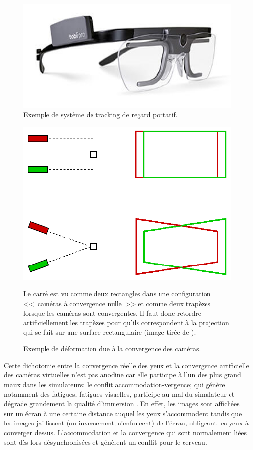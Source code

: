 	\begin{figure}[h]
		\centering
		\includegraphics[scale=1]{Figures/EyeTrackerTobii}
		\caption{Exemple de système de tracking de regard portatif.}
		\label{fig:eye_tracker}
	\end{figure}
	
	\begin{figure}[h]
		\centering
		\includegraphics[scale=.75]{Figures/RedressementPlansVision}
		\caption{Exemple de déformation due à la convergence des caméras.}{Le carré est vu comme deux rectangles dans une configuration <<~caméras à convergence nulle~>> et comme deux trapèzes lorsque les caméras sont convergentes. Il faut donc retordre artificiellement les trapèzes pour qu'ils correspondent à la projection qui se fait sur une surface rectangulaire (image tirée de \citep{aurat_immersion_2016}).}
		\label{fig:redressement_plan_vision}
	\end{figure}
	
	\par Cette dichotomie entre la convergence réelle des yeux et la convergence artificielle des caméras virtuelles n'est pas anodine car elle participe à l'un des plus grand maux dans les simulateurs: le conflit accommodation-vergence; qui génère notamment des fatigues, fatigues visuelles, participe au mal du simulateur et dégrade grandement la qualité d'immersion \citep{neveu_impact_2012}. En effet, les images sont affichées sur un écran à une certaine distance auquel les yeux s'accommodent tandis que les images jaillissent (ou inversement, s'enfoncent) de l'écran, obligeant les yeux à converger dessus. L'accommodation et la convergence qui sont normalement liées sont dès lors désynchronisées et génèrent un conflit pour le cerveau.
	

